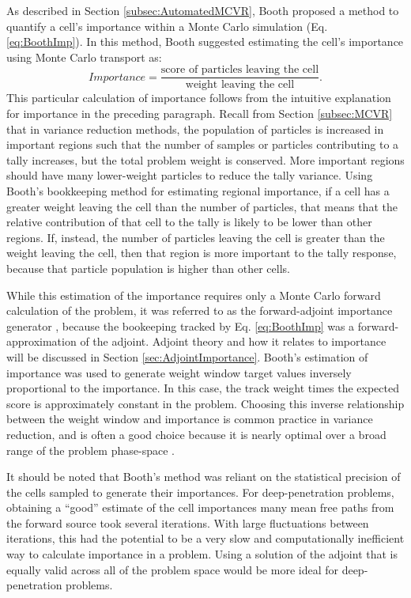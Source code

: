 As described in Section \ref{subsec:AutomatedMCVR}, Booth
\cite{booth_automatic_1982} proposed
a method to quantify a cell's importance within a Monte Carlo simulation
(Eq. \eqref{eq:BoothImp}). In
this method, Booth suggested estimating the cell's importance using Monte Carlo
transport as:
\begin{equation*}
  Importance  = \frac{\text{score of particles leaving the cell}}
                     {\text{weight leaving the cell}}.
\end{equation*}
This particular calculation of importance
follows from the intuitive explanation for importance in the preceding
paragraph. Recall from Section \ref{subsec:MCVR} that in variance reduction
methods, the population of particles is increased in important regions such that
the number of samples or particles contributing to a tally increases, but the
total problem weight is conserved. More important regions should have many
lower-weight particles to reduce the tally variance. Using Booth's bookkeeping
method for estimating regional importance,
if a cell has a greater weight leaving the cell than the number
of particles, that means that the relative contribution of that cell to the
tally is likely to be lower than other regions. If, instead, the number of
particles leaving the cell is greater than the weight leaving the cell, then
that region is more important to the tally response, because that particle
population is higher than other cells.

While this
estimation of the importance requires only a Monte Carlo forward calculation of
the problem, it was referred to as the forward-adjoint importance generator
\cite{booth_automatic_1982, booth_deep_1982, booth_importance_1984}, because the
bookeeping tracked by Eq. \eqref{eq:BoothImp} was a forward-approximation of the
adjoint. Adjoint theory and how it relates to importance will be discussed in
Section
\ref{sec:AdjointImportance}.
Booth's estimation of importance was used to generate
weight window target values inversely proportional to the importance.
In this case, the track weight times the expected score is approximately
constant in the problem. Choosing this inverse relationship between the weight
window and importance is common practice in variance reduction, and is often a
good choice because it is nearly optimal over a broad range of the problem
phase-space \cite{booth_common_2012}.

It should be noted that Booth's method was reliant on the statistical
precision of the cells sampled to generate their importances. For
deep-penetration problems, obtaining a ``good'' estimate of the cell importances
many mean free paths from the forward source took several iterations. With
large fluctuations between iterations, this had the potential to
be a very slow and
computationally inefficient way to calculate importance in a problem. Using a
solution of the adjoint that is equally valid across all of the problem space
would be more ideal for deep-penetration problems.

